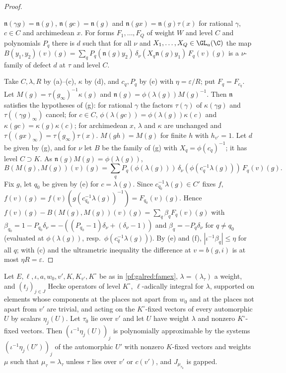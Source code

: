 \begin{proof}
\begin{enumerate}[label=(\alph*),nosep]
  $\mathfrak n(\gamma g)=\mathfrak n(g)$, $\mathfrak n(gc)=\mathfrak n(g)$ and $\mathfrak n(gx)=\mathfrak n(g)\tau(x)$ for
  rational $\gamma$, $c\in C$ and archimedean $x$. For forms $F_1,\dots,F_Q$ of weight $W$ and level $C$ and polynomials
  $P_q$ there is $d$ such that for all $\nu$ and $X_1,\dots,X_Q\in\GL_a(\C)$ the map
  $B(y_1,y_2)(v)(g)=\sum_qP_q(\mathfrak n(g)y_2)\,\delta_\nu(X_q\mathfrak n(g)y_1)\,F_q(v)(g)$ is a $\nu$-family of defect
  $d$ at $\tau$ and level $C$.
\end{enumerate}
Take $C,\lambda,R$ by (a)--(c), $\kappa$ by (d), and $c_q,P_q$ by (e) with $\eta=\varepsilon/R$; put $F_q=F_{c_q}$. Let
$M(g)=\tau(g_\infty)^{-1}\kappa(g)$ and $\mathfrak n(g)=\phi(\lambda(g))M(g)^{-1}$. Then $\mathfrak n$ satisfies the
hypotheses of (g): for rational $\gamma$ the factors $\tau(\gamma)$ of $\kappa(\gamma g)$ and $\tau((\gamma g)_\infty)$
cancel; for $c\in C$, $\phi(\lambda(gc))=\phi(\lambda(g))\kappa(c)$ and $\kappa(gc)=\kappa(g)\kappa(c)$; for archimedean $x$,
$\lambda$ and $\kappa$ are unchanged and $\tau((gx)_\infty)=\tau(g_\infty)\tau(x)$. $M(gh)=M(g)$ for finite $h$ with
$h_{v'}=1$. Let $d$ be given by (g), and for $\nu$ let $B$ be the family of (g) with $X_q=\phi(c_q)^{-1}$; it has level
$C\supset K$. As $\mathfrak n(g)M(g)=\phi(\lambda(g))$,
\[
  B(M(g),M(g))(v)(g)=\sum_qP_q(\phi(\lambda(g)))\,\delta_\nu(\phi(c_q^{-1}\lambda(g)))\,F_q(v)(g).
\]
Fix $g$, let $q_0$ be given by (e) for $c=\lambda(g)$. Since $c_{q_0}^{-1}\lambda(g)\in C'$ fixes $f$,
$f(v)(g)=f(v)(g(c_{q_0}^{-1}\lambda(g))^{-1})=F_{q_0}(v)(g)$. Hence $f(v)(g)-B(M(g),M(g))(v)(g)=\sum_q\beta_qF_q(v)(g)$ with
$\beta_{q_0}=1-P_{q_0}\delta_\nu=-((P_{q_0}-1)\delta_\nu+(\delta_\nu-1))$ and $\beta_q=-P_q\delta_\nu$ for $q\ne q_0$
(evaluated at $\phi(\lambda(g))$, resp.\ $\phi(c_q^{-1}\lambda(g))$). By (e) and (f), $|\iota^{-1}\beta_q|\le\eta$ for all $q$;
with (c) and the ultrametric inequality the difference at $v=b(g,i)$ is at most $\eta R=\varepsilon$.
\end{proof}

\begin{theorem}\label{pf:galred:wtlac}
Let $E,\ell,\iota,a,w_0,v',K,K_{v'},K^\circ$ be as in \cref{pf:galred:famex}, $\lambda=(\lambda_\tau)$ a weight, and
$(t_j)_{j\in J}$ Hecke operators of level $K^\circ$, $\ell$-adically integral for $\lambda$, supported on elements whose
components at the places not apart from $w_0$ and at the places not apart from $v'$ are trivial, and acting on the
$K^\circ$-fixed vectors of every automorphic $U$ by scalars $\eta_j(U)$. Let $\tau_0$ lie over $v'$ and let $U$ have weight
$\lambda$ and nonzero $K^\circ$-fixed vectors. Then $(\iota^{-1}\eta_j(U))_j$ is polynomially approximable by the systems
$(\iota^{-1}\eta_j(U'))_j$ of the automorphic $U'$ with nonzero $K$-fixed vectors and weights $\mu$ such that
$\mu_\tau=\lambda_\tau$ unless $\tau$ lies over $v'$ or $c(v')$, and $J_{\mu_{\tau_0}}$ is gapped.
\end{theorem}

